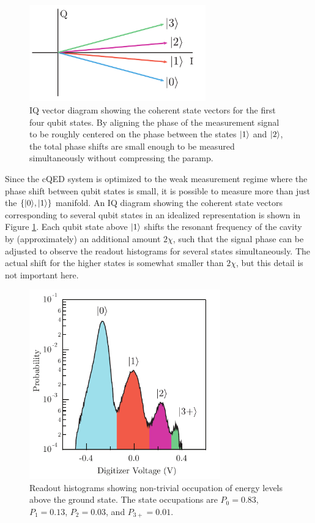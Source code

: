 \begin{figure}
\begin{center}
	\includegraphics[width = 3in]{qfb_exp_chapter/qutemp_IQ}
\end{center}
\caption[IQ vectors for multi-state readout]{IQ vector diagram showing the coherent state vectors for the first four qubit states.  By aligning the phase of the measurement signal to be roughly centered on the phase between the states $|1\rangle$ and $|2\rangle$, the total phase shifts are small enough to be measured simultaneously without compressing the paramp.}
\label{fig:qutemp_IQ}
\end{figure}

Since the cQED system is optimized to the weak measurement regime where the phase shift between qubit states is small, it is possible to measure more than just the $\{ |0\rangle,|1\rangle \}$ manifold.  An IQ diagram showing the coherent state vectors corresponding to several qubit states in an idealized representation is shown in Figure \ref{fig:qutemp_IQ}.  Each qubit state above $|1\rangle$ shifts the resonant frequency of the cavity by (approximately) an additional amount $2 \chi$, such that the signal phase can be adjusted to observe the readout histograms for several states simultaneously.  The actual shift for the higher states is somewhat smaller than $2 \chi$, but this detail is not important here.

\begin{figure}
\begin{center}
	\includegraphics[width = 3.25in]{qfb_exp_chapter/qutemp}
\end{center}
\caption[Qubit temperature histograms]{Readout histograms showing non-trivial occupation of energy levels above the ground state.  The state occupations are $P_0 = 0.83$, $P_1 = 0.13$, $P_2 = 0.03$, and $P_{3+} = 0.01$.}
\label{fig:qutemp}
\end{figure}


